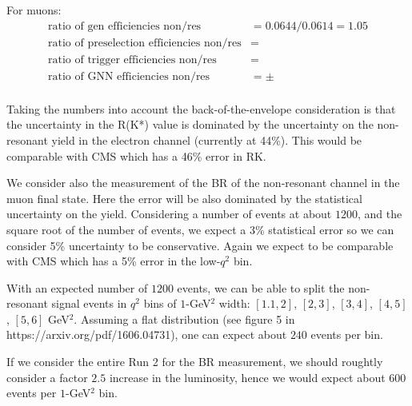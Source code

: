 For muons:
\begin{align}
  {\textrm{ratio of gen efficiencies non/res}} &=  0.0644/0.0614 = 1.05  \\
  {\textrm{ratio of preselection efficiencies non/res}} &=  \\
  {\textrm{ratio of trigger efficiencies non/res}} &=  \\
  {\textrm{ratio of GNN efficiencies non/res}} &=  \pm \\
\end{align}

Taking the numbers into account the back-of-the-envelope consideration is that
the uncertainty in the R(K*) value is dominated by the uncertainty on the
non-resonant yield in the electron channel (currently at 44\%). This would be
comparable with CMS which has a 46\% error in RK.

We consider also the measurement of the BR of the non-resonant channel in the
muon final state. Here the error will be also dominated by the statistical
uncertainty on the yield. Considering a number of events at about $1200$, and
the square root of the number of events, we expect a 3\% statistical error so
we can consider 5\% uncertainty to be conservative.
Again we expect to be comparable with CMS which has a 5\% error in the low-$q^2$ bin.

With an expected number of $1200$ events, we can be able to split the non-resonant
signal events in $q^2$ bins of $1$-GeV$^2$ width:
$[1.1, 2]$, $[2, 3]$, $[3, 4]$, $[4, 5]$, $[5, 6]$ GeV$^2$.
Assuming a flat distribution (see figure 5 in https://arxiv.org/pdf/1606.04731),
one can expect about $240$ events per bin.

If we consider the entire Run 2 for the BR measurement, we should roughtly consider
a factor $2.5$ increase in the luminosity, hence we would expect about $600$ events per
$1$-GeV$^2$ bin.
